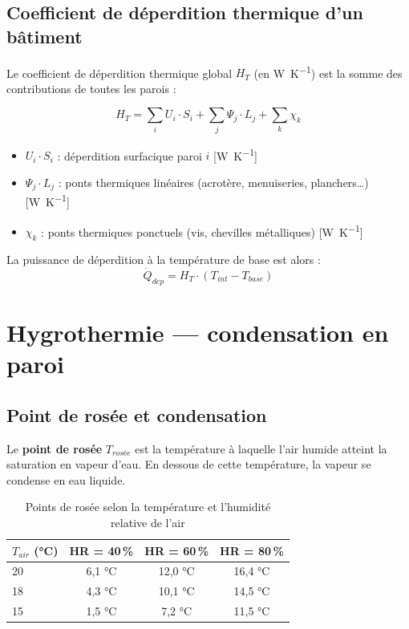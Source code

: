 \subsection{Coefficient de déperdition thermique d'un bâtiment}

Le coefficient de déperdition thermique global $H_T$ (en \si{\watt\per\kelvin}) est la somme des contributions de toutes les parois :

\begin{equation}
  H_T = \sum_i U_i \cdot S_i + \sum_j \Psi_j \cdot L_j + \sum_k \chi_k
\end{equation}

\begin{itemize}
  \item $U_i \cdot S_i$ : déperdition surfacique paroi $i$ [\si{\watt\per\kelvin}]
  \item $\Psi_j \cdot L_j$ : ponts thermiques linéaires (acrotère, menuiseries, planchers…) [\si{\watt\per\kelvin}]
  \item $\chi_k$ : ponts thermiques ponctuels (vis, chevilles métalliques) [\si{\watt\per\kelvin}]
\end{itemize}

La puissance de déperdition à la température de base est alors :
\begin{equation}
  \dot{Q}_{dep} = H_T \cdot (T_{int} - T_{base})
\end{equation}

\section{Hygrothermie — condensation en paroi}

\subsection{Point de rosée et condensation}

\begin{definition}
  Le \textbf{point de rosée} $T_{rosée}$ est la température à laquelle l'air humide atteint la saturation en vapeur d'eau. En dessous de cette température, la vapeur se condense en eau liquide.
\end{definition}

\begin{table}[H]
  \centering
  \caption{Points de rosée selon la température et l'humidité relative de l'air}
  \begin{tabular}{lccc}
    \toprule
    $T_{air}$ (°C) & HR = 40\,\% & HR = 60\,\% & HR = 80\,\% \\
    \midrule
    20 & 6,1 °C & 12,0 °C & 16,4 °C \\
    18 & 4,3 °C & 10,1 °C & 14,5 °C \\
    15 & 1,5 °C & 7,2 °C & 11,5 °C \\
    \bottomrule
  \end{tabular}
\end{table}

